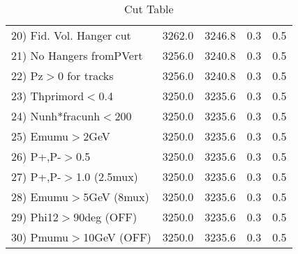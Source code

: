 \begin{table}[h!]
\begin{tabular}{||l||r|r|r|r||}
 20) Fid. Vol. Hanger cut &      3262.0 &      3246.8 &         0.3 &         0.5 \\
 21) No Hangers fromPVert &      3256.0 &      3240.8 &         0.3 &         0.5 \\
 22) Pz$>$0 for tracks    &      3256.0 &      3240.8 &         0.3 &         0.5 \\
 23) Thprimord$<$0.4      &      3250.0 &      3235.6 &         0.3 &         0.5 \\
 24) Nunh*fracunh$<$200   &      3250.0 &      3235.6 &         0.3 &         0.5 \\
 25) Emumu$>$2GeV         &      3250.0 &      3235.6 &         0.3 &         0.5 \\
 26) P+,P-$>$0.5          &      3250.0 &      3235.6 &         0.3 &         0.5 \\
 27) P+,P-$>$1.0 (2.5mux) &      3250.0 &      3235.6 &         0.3 &         0.5 \\
 28) Emumu$>$5GeV  (8mux) &      3250.0 &      3235.6 &         0.3 &         0.5 \\
 29) Phi12$>$90deg  (OFF) &      3250.0 &      3235.6 &         0.3 &         0.5 \\
 30) Pmumu$>$10GeV  (OFF) &      3250.0 &      3235.6 &         0.3 &         0.5 \\
 \hline
 \hline
 \end{tabular}
 \caption{Cut Table \cohjp  }
 \label{tab-cut__jpsi}
 \end{table}
